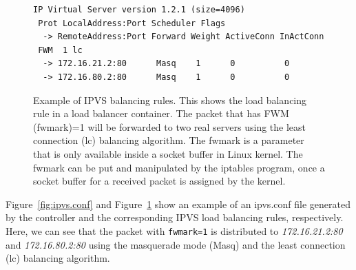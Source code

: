 \begin{figure}[h]
  \centering
  \begin{minipage}{0.95\columnwidth}
   \begin{lstlisting}[frame=lines,breaklines=true,basicstyle=\small\ttfamily]
 IP Virtual Server version 1.2.1 (size=4096)
 Prot LocalAddress:Port Scheduler Flags
  -> RemoteAddress:Port Forward Weight ActiveConn InActConn
 FWM  1 lc
  -> 172.16.21.2:80      Masq    1      0          0         
  -> 172.16.80.2:80      Masq    1      0          0
   \end{lstlisting}
  \end{minipage}

  \par\bigskip
  \centering
  \begin{minipage}{0.9\columnwidth}
    \caption[Example of IPVS balancing rules]{
      Example of IPVS balancing rules.
      This shows the load balancing rule in a load balancer container.
      The packet that has FWM (fwmark)=1 will be forwarded to two real servers using the least connection (lc) balancing algorithm.
      The fwmark is a parameter that is only available inside a socket buffer in Linux kernel.
      The fwmark can be put and manipulated by the iptables program, once a socket buffer for a received packet is assigned by the kernel.
      }
    \label{fig:IPVS rule}
  \end{minipage}
\end{figure}

Figure~\ref{fig:ipvs.conf} and Figure~\ref{fig:IPVS rule} show an example of an ipvs.conf file 
generated by the controller and the corresponding IPVS load balancing rules, respectively.
Here, we can see that the packet with {\tt fwmark=1} \cite{BertHubert2002} is distributed 
to {\em 172.16.21.2:80} and {\em 172.16.80.2:80} using the masquerade mode (Masq) and the least connection (lc) \cite{Zhang2000} balancing algorithm.

\FloatBarrier

